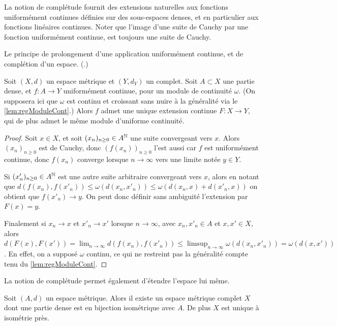 La notion de complétude fournit des extensions naturelles aux fonctions uniformément continues définies sur des sous-espaces denses, et en particulier aux fonctions linéaires continues. 
Noter que l'image d'une suite de Cauchy par une fonction uniformément continue, est toujours une suite de Cauchy. 

\begin{retenir}
Le principe de prolongement d'une application uniformément continue, et de complétion d'un espace.
(.)
\end{retenir}


\begin{proposition}
\label{prop:prolongement_complet}
%
	Soit $(X,d)$ un espace métrique et $(Y,d_Y)$ un complet. Soit $A \subset X$ une partie dense, et $f:A \to Y$ uniformément continue, pour un module de continuité $\omega$. (On supposera ici que $\omega$ est continu et croissant sans nuire à la généralité via le \cref{lem:regModuleCont}.) Alors $f$ admet une unique extension continue $F : X \to Y$, qui de plus admet le même module d'uniforme continuité. 
\end{proposition}

\begin{proof}
	Soit $x\in X$, et soit $(x_n)_{n \geq 0} \in A^{\mathbb{N}}$ une suite convergeant vers $x$. Alors $(x_n)_{n \geq 0}$ est de Cauchy, donc $(f(x_n))_{n \geq 0}$ l'est aussi car $f$ est uniformément continue, donc $f(x_n)$ converge lorsque $n \to \infty$ vers une limite notée $y\in Y$. 
	
	Si $(x'_n)_{n \geq 0} \in A^{\mathbb{N}}$ est une autre suite arbitraire convergeant vers $x$, alors en notant que $d(f(x_n),f(x'_n)) \leq \omega(d(x_n,x'_n)) \leq \omega(d(x_n,x)+d(x'_n,x))$ on obtient que $f(x'_n) \to y$. On peut donc définir sans ambiguité l'extension par $F(x) = y$. 
	
	Finalement si $x_n \to x$ et $x'_n \to x'$ lorsque $n \to \infty$, avec $x_n,x'_n \in A$ et $x,x'\in X$, alors $d(F(x),F(x')) = \lim_{n \to \infty} d(f(x_n),f(x'_n)) \leq \limsup_{n \to \infty} \omega(d(x_n,x'_n)) = \omega(d(x,x'))$. En effet, on a supposé $\omega$ continu, ce qui ne restreint pas la généralité compte tenu du \cref{lem:regModuleCont}.
\end{proof}


La notion de complétude permet également d'étendre l'espace lui même. 

\begin{proposition}
\label{prop:espaceComplete}
%
Soit $(A,d)$ un espace métrique. Alors il existe un espace métrique complet $X$ dont une partie dense est en bijection isométrique avec $A$. De plus $X$ est unique à isométrie près. 
\end{proposition}

